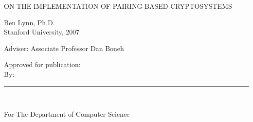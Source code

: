 \documentclass[12pt]{report}
\def\title{On the Implementation of Pairing-Based Cryptosystems}
\def\author{Ben Lynn}
\def\year{2007}
\def\principaladviser{Associate Professor Dan Boneh}
\def\department{The Department of Computer Science}
\begin{document}
\pagestyle{empty}

\leavevmode
\vfill


\begin{center}

    \Large\uppercase\expandafter
    {\title}

\end{center}

\begin{center}

    \author, Ph.D. \\
    Stanford University, \year \\

    \vspace{\baselineskip}

    Adviser:  \principaladviser

\end{center}

{}




\vfill

\hfill\parbox{3.2in}{\raggedright Approved for publication: \\[4mm]

              By:\hfill\rule[-2mm]{74mm}{0.4pt} \\[3pt]
    \hfill \parbox{74mm}{\raggedright For \department} }
\end{document}
